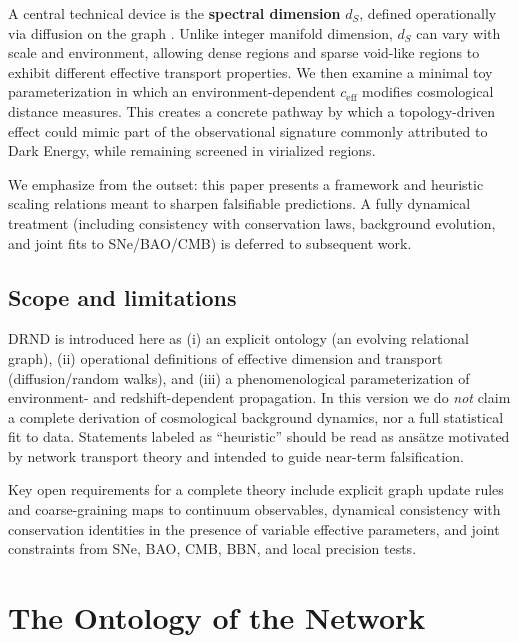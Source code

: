 \documentclass[12pt]{iopart}
\begin{document}
A central technical device is the \textbf{spectral dimension} $d_S$, defined operationally via diffusion on the graph \cite{Ambjorn2005}. Unlike integer manifold dimension, $d_S$ can vary with scale and environment, allowing dense regions and sparse void-like regions to exhibit different effective transport properties. We then examine a minimal toy parameterization in which an environment-dependent $c_{\mathrm{eff}}$ modifies cosmological distance measures. This creates a concrete pathway by which a topology-driven effect could mimic part of the observational signature commonly attributed to Dark Energy, while remaining screened in virialized regions.

We emphasize from the outset: this paper presents a framework and heuristic scaling relations meant to sharpen falsifiable predictions. A fully dynamical treatment (including consistency with conservation laws, background evolution, and joint fits to SNe/BAO/CMB) is deferred to subsequent work.

\subsection{Scope and limitations}
DRND is introduced here as (i) an explicit ontology (an evolving relational graph), (ii) operational definitions of effective dimension and transport (diffusion/random walks), and (iii) a phenomenological parameterization of environment- and redshift-dependent propagation. In this version we do \emph{not} claim a complete derivation of cosmological background dynamics, nor a full statistical fit to data. Statements labeled as ``heuristic'' should be read as ans\"atze motivated by network transport theory and intended to guide near-term falsification.

Key open requirements for a complete theory include explicit graph update rules and coarse-graining maps to continuum observables, dynamical consistency with conservation identities in the presence of variable effective parameters, and joint constraints from SNe, BAO, CMB, BBN, and local precision tests.

\section{The Ontology of the Network}
\end{document}
